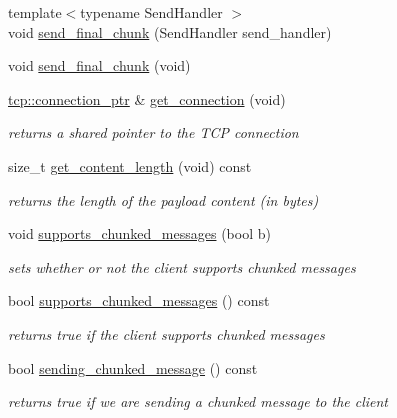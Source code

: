 \begin{DoxyCompactItemize}
\item 
{\footnotesize template$<$typename Send\-Handler $>$ }\\void \hyperlink{classpion_1_1http_1_1writer_a1001000ab1c48af56e1de38d0b92e22f}{send\-\_\-final\-\_\-chunk} (Send\-Handler send\-\_\-handler)
\item 
void \hyperlink{classpion_1_1http_1_1writer_a902953ed4ab1f0a009f8fc4517735351}{send\-\_\-final\-\_\-chunk} (void)
\item 
\hyperlink{namespacepion_1_1tcp_a6c9b7497068009f6d81d95ec0b0627d6}{tcp\-::connection\-\_\-ptr} \& \hyperlink{classpion_1_1http_1_1writer_ae65148e4a1e72266e64c4ab1ceed2c17}{get\-\_\-connection} (void)
\begin{DoxyCompactList}\small\item\em returns a shared pointer to the T\-C\-P connection \end{DoxyCompactList}\item 
size\-\_\-t \hyperlink{classpion_1_1http_1_1writer_a980285662a960320b561e419563a83e2}{get\-\_\-content\-\_\-length} (void) const 
\begin{DoxyCompactList}\small\item\em returns the length of the payload content (in bytes) \end{DoxyCompactList}\item 
void \hyperlink{classpion_1_1http_1_1writer_ae2d856d25a3e4859d3f5f86d4d269364}{supports\-\_\-chunked\-\_\-messages} (bool b)
\begin{DoxyCompactList}\small\item\em sets whether or not the client supports chunked messages \end{DoxyCompactList}\item 
bool \hyperlink{classpion_1_1http_1_1writer_ab7a31c41238ac7524eb8a2cc461a153b}{supports\-\_\-chunked\-\_\-messages} () const 
\begin{DoxyCompactList}\small\item\em returns true if the client supports chunked messages \end{DoxyCompactList}\item 
bool \hyperlink{classpion_1_1http_1_1writer_a7a9f95f0cc0ccf1d091a94d5ba5ecebc}{sending\-\_\-chunked\-\_\-message} () const 
\begin{DoxyCompactList}\small\item\em returns true if we are sending a chunked message to the client \end{DoxyCompactList}\item 

\end{DoxyCompactItemize}
